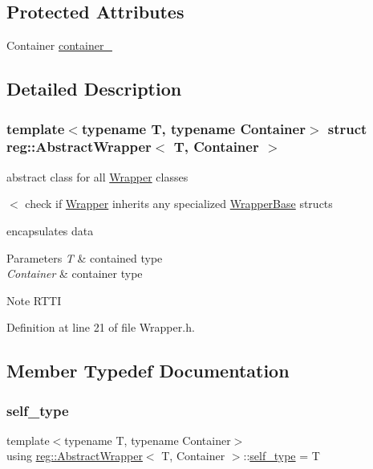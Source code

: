 \subsection*{Protected Attributes}
\begin{DoxyCompactItemize}
\item 
Container \hyperlink{structreg_1_1_abstract_wrapper_a76a3713665e76d5ef8437681c7f309aa}{container\+\_\+}
\end{DoxyCompactItemize}


\subsection{Detailed Description}
\subsubsection*{template$<$typename T, typename Container$>$\newline
struct reg\+::\+Abstract\+Wrapper$<$ T, Container $>$}

abstract class for all \hyperlink{structreg_1_1_wrapper}{Wrapper} classes 

$<$ check if \hyperlink{structreg_1_1_wrapper}{Wrapper} inherits any specialized \hyperlink{structreg_1_1_wrapper_base}{Wrapper\+Base} structs

encapsulates data 
\begin{DoxyParams}{Parameters}
{\em T} & contained type \\
\hline
{\em Container} & container type \\
\hline
\end{DoxyParams}
\begin{DoxyNote}{Note}
R\+T\+TI 
\end{DoxyNote}


Definition at line 21 of file Wrapper.\+h.



\subsection{Member Typedef Documentation}
\mbox{\label{structreg_1_1_abstract_wrapper_a65e2282260e636ac1956862c158caa59}} 
\subsubsection{\texorpdfstring{self\+\_\+type}{self\_type}}
{\footnotesize\ttfamily template$<$typename T, typename Container$>$ \\
using \hyperlink{structreg_1_1_abstract_wrapper}{reg\+::\+Abstract\+Wrapper}$<$ T, Container $>$\+::\hyperlink{structreg_1_1_abstract_wrapper_a65e2282260e636ac1956862c158caa59}{self\+\_\+type} =  T}



